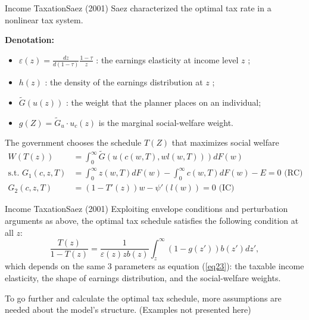 \documentclass{beamer}
\begin{document}
\begin{frame}{Income Taxation}{Saez (2001)}
	Saez characterized the optimal tax rate in a nonlinear tax system.
	
	\textbf{Denotation:}
	\begin{itemize}
		\item $\varepsilon(z)=\frac{dz}{d(1-\tau)}\frac{1-\tau}{z}$ : the earnings elasticity at income level $z$ ;
		\item $h(z)$ : the density of the earnings distribution at $z$ ;
		\item $\tilde{G}(u(z))$ : the weight that the planner places on an individual;
		\item $g(Z)=\tilde{G}_u\cdot u_c(z)$ is the marginal social-welfare weight.
	\end{itemize}
	\medskip

	The government chooses the schedule $T(Z)$ that maximizes social welfare
	\begin{equation}\nonumber
		\begin{aligned}
			W(T(z)) &= \int_0^\infty\tilde{G}(u(c(w,T),wl(w,T)))dF(w) \\
			\mbox{s.t. }G_1(c,z,T) &= \int_0^\infty z(w,T)dF(w)-\int_0^\infty c(w,T)dF(w)-E=0 \mbox{ (RC)} \\
			G_2(c,z,T) &= (1-T'(z))w-\psi'(l(w))=0 \mbox{ (IC)}
		\end{aligned}
	\end{equation}
\end{frame}
\begin{frame}{Income Taxation}{Saez (2001)}
	Exploiting envelope conditions and perturbation arguments as above, the optimal tax schedule satisfies the following condition at all $z$:
	\begin{equation}
		\frac{T(z)}{1-T(z)} = \frac{1}{\varepsilon(z)zb(z)}\int_z^\infty (1-g(z'))b(z')dz',
	\end{equation}
	which depends on the same 3 parameters as equation (\ref{eq23}): the taxable income elasticity, the shape of earnings distribution, and the social-welfare weights.
	\medskip

	To go further and calculate the optimal tax schedule, more assumptions are needed about the model’s structure. (Examples not presented here)
\end{frame}
\end{document}
